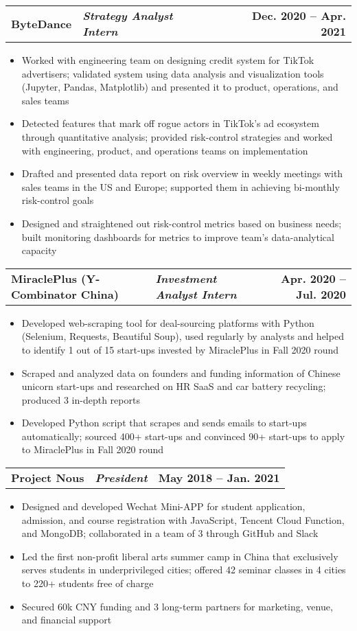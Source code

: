 \documentclass[11pt,a4paper,extrafontsizes,twoside]{memoir}
\makeatletter
\newcommand{\resumeItem}[1]{
  \item\small{
    {#1 \vspace{-2pt}}
  }
}
\newcommand{\resumeSubheading}[3]{
  \vspace{-2pt}\item
    \begin{tabular*}{1.0\textwidth}[t]{p{7.5cm} p{8cm} @{\extracolsep{\fill}} r}
      \textbf{\color{emph}#1} & \textbf{\textit{\color{emph}\small#3}} & \textbf{\footnotesize #2} \\
    \end{tabular*}\vspace{-7pt}
}
\newcommand{\resumeItemListStart}{\begin{itemize}}
\newcommand{\resumeItemListEnd}{\end{itemize}\vspace{-5pt}}
\makeatother
\begin{document}
    \resumeSubheading
      {ByteDance}{Dec. 2020 -- Apr. 2021}
      {Strategy Analyst Intern}
      \resumeItemListStart
        \resumeItem{Worked with engineering team on designing credit system for TikTok advertisers; validated system using data analysis and visualization tools (Jupyter, Pandas, Matplotlib) and presented it to product, operations, and sales teams}
        \resumeItem{Detected features that mark off rogue actors in TikTok's ad ecosystem through quantitative analysis; provided risk-control strategies and worked with engineering, product, and operations teams on implementation}
        \resumeItem{Drafted and presented data report on risk overview in weekly meetings with sales teams in the US and Europe; supported them in achieving bi-monthly risk-control goals}
        \resumeItem{Designed and straightened out risk-control metrics based on business needs; built monitoring  dashboards for metrics to improve team’s data-analytical capacity}
    \resumeItemListEnd

    \resumeSubheading
      {MiraclePlus (Y-Combinator China)}{Apr. 2020 -- Jul. 2020}
      {Investment Analyst Intern}
      \resumeItemListStart
        \resumeItem{Developed web-scraping tool for deal-sourcing platforms with Python (Selenium, Requests, Beautiful Soup), used regularly by analysts and helped to identify 1 out of 15 start-ups invested by MiraclePlus in Fall 2020 round}
        \resumeItem{Scraped and analyzed data on founders and funding information of Chinese unicorn start-ups and researched on HR SaaS and car battery recycling; produced 3 in-depth reports}
        \resumeItem{Developed Python script that scrapes and sends emails to start-ups automatically; sourced 400+ start-ups and convinced 90+ start-ups to apply to MiraclePlus in Fall 2020 round}
    \resumeItemListEnd

    \resumeSubheading
      {Project Nous}{May 2018 -- Jan. 2021}
      {President}
      \resumeItemListStart
        \resumeItem{Designed and developed Wechat Mini-APP for student application, admission, and course registration with JavaScript, Tencent Cloud Function, and MongoDB; collaborated in a team of 3 through GitHub and Slack}
        \resumeItem{Led the first non-profit liberal arts summer camp in China that exclusively serves students in underprivileged cities; offered 42 seminar classes in 4 cities to 220+ students free of charge}
        \resumeItem{Secured 60k CNY funding and 3 long-term partners for marketing, venue, and financial support}
    \resumeItemListEnd
\end{document}
